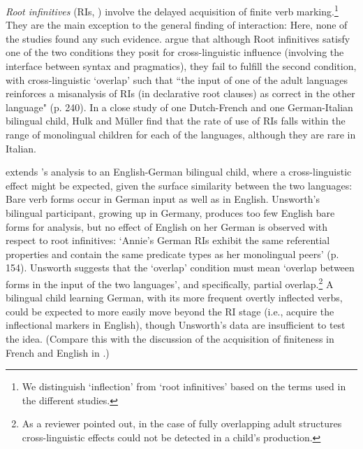 \documentclass[output=paper]{langscibook}
\begin{document}
\textit{Root infinitives} (RIs, ) involve the delayed acquisition of finite verb marking.\footnote{We distinguish ‘inflection’ from ‘root infinitives’ based on the terms used in the different studies.} They are the main exception to the general finding of interaction: Here, none of the studies found any such evidence. \citet{HulkMüller2000} argue that although Root infinitives satisfy one of the two conditions they posit for cross-linguistic influence (involving the interface between syntax and pragmatics), they fail to fulfill the second condition, with cross-linguistic ‘overlap’ such that ``the input of one of the adult languages reinforces a misanalysis of RIs (in declarative root clauses) as correct in the other language" (p. 240). In a close study of one Dutch-French and one German-Italian bilingual child, Hulk and Müller find that the rate of use of RIs falls within the range of monolingual children for each of the languages, although they are rare in Italian.


\citet{Unsworth2003} extends \citeauthor{HulkMüller2000}’s analysis to an English-German bilingual child, where a cross-linguistic effect might be expected, given the surface similarity between the two languages: Bare verb forms occur in German input as well as in English. Unsworth’s bilingual participant, growing up in Germany, produces too few English bare forms for analysis, but no effect of English on her German is observed with respect to root infinitives: ‘Annie’s German RIs exhibit the same referential properties and contain the same predicate types as her monolingual peers’ (p. 154). Unsworth suggests that the ‘overlap’ condition must mean ‘overlap between forms in the input of the two languages’, and specifically, partial overlap.\footnote{As a reviewer pointed out, in the case of fully overlapping adult structures cross-linguistic effects could not be detected in a child’s production.}  A bilingual child learning German, with its more frequent overtly inflected verbs, could be expected to more easily move beyond the RI stage (i.e., acquire the inflectional markers in English), though Unsworth’s data are insufficient to test the idea. (Compare this with the discussion of the acquisition of finiteness in French and English in \citealt{ParadisGenesee1996}.)
\end{document}
